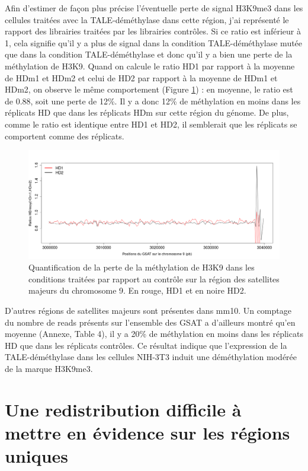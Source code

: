 \documentclass[a4paper,12pt,times]{report}
\newcommand{\scaption}[1]{\caption{\footnotesize{#1}}}
\begin{document}
Afin d'estimer de façon plus précise l'éventuelle perte de signal H3K9me3 dans les cellules traitées avec la TALE-déméthylase dans cette région, j'ai représenté le rapport des librairies traitées par les librairies contrôles. Si ce ratio est inférieur à 1, cela signifie qu'il y a plus de signal dans la condition TALE-déméthylase mutée que dans la condition TALE-déméthylase et donc qu'il y a bien une perte de la méthylation de H3K9. 
Quand on calcule le ratio HD1 par rapport à la moyenne de HDm1 et HDm2 et celui de HD2 par rapport à la moyenne de HDm1 et HDm2, on observe le même comportement (Figure \ref{IGVratio}) :  en moyenne, le ratio est de 0.88, soit une perte de 12\%.
Il y a donc 12\% de méthylation en moins dans les réplicats HD que dans les réplicats HDm sur cette région du génome.
De plus, comme le ratio est identique entre HD1 et HD2, il semblerait que les réplicats se comportent comme des réplicats.

 \begin{figure}[!h]
   \centering
    \includegraphics[scale=0.45]{Rplot200.png}
   \scaption{Quantification de la perte de  la méthylation de H3K9 dans les conditions traitées par rapport au contrôle sur la région des satellites majeurs du chromosome 9. En rouge,  HD1 et en noire HD2. }
  \label{IGVratio}
  \end{figure}
  

  D'autres régions de satellites majeurs sont présentes dans mm10.  Un comptage du nombre de reads présents sur l'ensemble des GSAT a d'ailleurs montré qu'en moyenne (Annexe, Table 4), il y a 20\% de méthylation en moins dans les réplicats HD que dans les réplicats contrôles.
Ce résultat indique que l'expression de la TALE-déméthylase dans les cellules NIH-3T3 induit une déméthylation modérée de la marque H3K9me3.
      \newpage
    \section{Une redistribution difficile à mettre en évidence sur les régions uniques}
     
\end{document}
